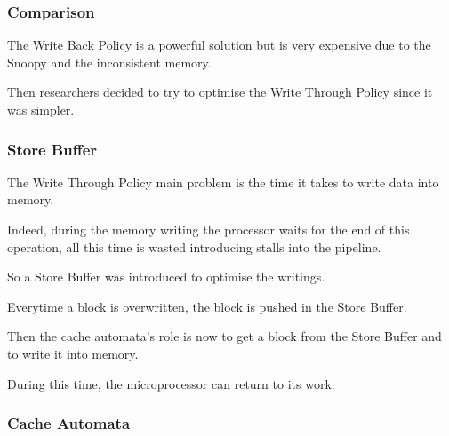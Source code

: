 
\begin{frame}
  \frametitle{Comparison}

  The Write Back Policy is a powerful solution but is very expensive
  due to the Snoopy and the inconsistent memory.

  \-

  Then researchers decided to try to optimise the Write Through Policy
  since it was simpler.
\end{frame}


\begin{frame}
  \frametitle{Store Buffer}

  The Write Through Policy main problem is the time it takes to write
  data into memory.

  \-

  Indeed, during the memory writing the processor waits for the end of this
  operation, all this time is wasted introducing stalls into the pipeline.

  \-

  So a Store Buffer was introduced to optimise the writings.

  \-

  Everytime a block is overwritten, the block is pushed in the Store Buffer.

  \-

  Then the cache automata's role is now to get a block from the Store Buffer
  and to write it into memory.

  \-

  During this time, the microprocessor can return to its work.
\end{frame}


\begin{frame}
  \frametitle{Cache Automata}

  \begin{center}
  \end{center}
\end{frame}


